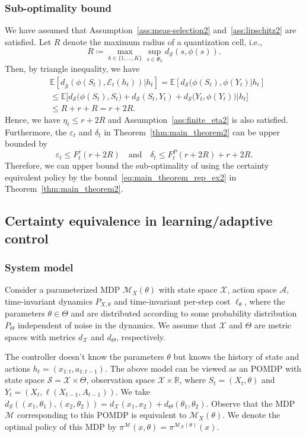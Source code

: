 \documentclass[letterpaper, 10pt]{IEEEtran}
\theoremstyle{plain}
\theoremstyle{nonumberplain}
\theoremstyle{plain}
\newcommand*\ALPHABET{\mathcal}
\newcommand*\ABSTRACT{\tilde}
\newcommand*\EXP{\mathds{E}}
\newcommand*\reals{\mathds{R}}
\newcommand\dS{d_{\ALPHABET S}}
\newcommand\dhS{d_{\ABSTRACT {\ALPHABET S}}}
\newcommand\EST{\mathcal{E}}
\begin{document}
\subsubsection{Sub-optimality bound}
We have assumed that Assumption~\ref{ass:meas-selection2} and~\ref{ass:lipschitz2} are satisfied. Let
$R$ denote the maximum radius of a quantization cell, i.e., 
\[
   R \coloneqq \max_{k \in \{1, \dots, K\}} \sup_{s \in \Psi_k}d_{\ALPHABET S}(s, \phi(s)).
\]
Then, by triangle inequality, we have
\begin{align}
  &\EXP[ \dhS(\phi(S_t), \EST_t(h_t)) |  h_t ]  
  = \EXP[ \dS(\phi(S_t), \phi(Y_t) |  h_t ] \nonumber \\
   &\leq \EXP \bigl[ \dS\bigl(\phi(S_t),S_t) + \dS (S_t, Y_t) + \dS\bigl(Y_t, \phi(Y_t)\bigr) | h_t \bigr] \nonumber \\
   &\leq R + r + R = r + 2R.
\end{align}
Hence, we have $\eta_t \leq r + 2R$ and Assumption~\ref{ass:finite_eta2} is also satisfied. Furthermore, the $\varepsilon_t$ and $\delta_t$ in Theorem~\ref{thm:main_theorem2} can be upper bounded by
\[
    \varepsilon_t \leq F_t^c(r + 2R)
    \quad\text{and}\quad
    \delta_t \leq F_t^P(r + 2R) + r + 2R.
\]
Therefore, we can upper bound the sub-optimality of using the certainty equivalent policy by the bound~\eqref{eq:main_theorem_rep_ex2} in Theorem~\ref{thm:main_theorem2}.

\subsection{Certainty equivalence in learning/adaptive control}
\subsubsection{System model}
Consider a parameterized MDP $\ALPHABET M_X(\theta)$ with state space $\ALPHABET X$, action space $\ALPHABET A$, time-invariant dynamics $P_{X,\theta}$ and time-invariant per-step cost $\ell_{\theta}$, where the parameters $\theta \in \Theta$ and are distributed according to some probability distribution~$P_{\Theta}$ independent of noise in the dynamics. We assume that $\ALPHABET X$ and $\Theta$ are metric spaces with metrics $d_{\ALPHABET X}$ and $d_{\Theta}$, respectively.

The controller doesn't know the parameters $\theta$ but knows the history of state and actions $h_t = (x_{1:t}, a_{1:t-1})$. The above model can be viewed as an POMDP with state space $\ALPHABET S = \ALPHABET X \times \Theta$, observation space $\ALPHABET X \times \reals$, where $S_t = (X_t, \theta)$ and $Y_t = (X_t, \ell(X_{t-1}, A_{t-1}))$. We take $d_{\ALPHABET S}((x_1,\theta_1), (x_2,\theta_2)) = d_{\ALPHABET X}(x_1, x_2) + d_{\Theta}(\theta_1, \theta_2)$.  Observe that the MDP $\ALPHABET M$ corresponding to this POMDP is equivalent to $\ALPHABET M_X(\theta)$. We denote the optimal policy of this MDP by $\pi^{\ALPHABET M}( x, \theta) = \pi^{\ALPHABET M_X(\theta)}(x)$.
\end{document}
